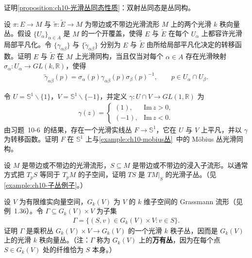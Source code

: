 \documentclass[../../main.tex]{subfiles}
\begin{document}
\begin{exercise}\label{exercise:ch10-11}
证明\cref{proposition:ch10-光滑丛同态性质}：双射丛同态是丛同构。
\end{exercise}

\begin{exercise}\label{exercise:ch10-12}
设 $\pi\colon E\to M$ 与 $\widetilde\pi\colon\widetilde E\to M$ 为带边或不带边光滑流形 $M$ 上的两个光滑 $k$ 秩向量丛。假设 $\{U_\alpha\}_{\alpha\in A}$ 是 $M$ 的一个开覆盖，使得 $E$ 与 $\widetilde E$ 在每个 $U_\alpha$ 上都容许光滑局部平凡化。令 $\{\gamma_{\alpha\beta}\}$ 与 $\{\widetilde\gamma_{\alpha\beta}\}$ 分别为 $E$ 与 $\widetilde E$ 由所给局部平凡化决定的转移函数。证明 $E$ 与 $\widetilde E$ 在 $M$ 上光滑同构，当且仅当对每个 $\alpha\in A$ 存在光滑映射 $\sigma_\alpha\colon U_\alpha\to GL(k,\mathbb{R})$，使得
\begin{align*}
\widetilde\gamma_{\alpha\beta}(p)=\sigma_\alpha(p)\gamma_{\alpha\beta}(p)\sigma_\beta(p)^{-1},\qquad p\in U_\alpha\cap U_\beta.
\end{align*}
\end{exercise}

\begin{exercise}\label{exercise:ch10-13}
令 $U=\mathbb{S}^1\smallsetminus\{1\}$，$V=\mathbb{S}^1\smallsetminus\{-1\}$，并定义 $\gamma\colon U\cap V\to GL(1,\mathbb{R})$ 为
\begin{align*}
\gamma(z)=
\begin{cases}
(1),&\mathrm{Im}\,z>0,\\
(-1),&\mathrm{Im}\,z<0.
\end{cases}
\end{align*}
由习题~10-6~的结果，存在一个光滑实线丛 $F\to\mathbb{S}^1$，它在 $U$ 与 $V$ 上平凡，并以 $\gamma$ 为转移函数。证明 $F$ 在 $\mathbb{S}^1$ 上与\cref{example:ch10-mobius丛}~中的 Möbius 丛光滑同构。
\end{exercise}

\begin{exercise}\label{exercise:ch10-14}
设 $M$ 是带边或不带边的光滑流形，$S\subseteq M$ 是带边或不带边的浸入子流形。以通常方式把 $T_pS$ 等同于 $T_pM$ 的子空间，证明 $TS$ 是 $TM|_S$ 的光滑子丛。（见\cref{example:ch10-子丛例子}。）
\end{exercise}

\begin{exercise}[万有丛]\label{exercise:ch10-15}
设 $V$ 为有限维实向量空间，$G_k(V)$ 为 $V$ 的 $k$ 维子空间的 Grassmann 流形（见例~1.36）。令 $\Gamma\subseteq G_k(V)\times V$ 为子集
\begin{align*}
\Gamma=\{(S,v)\in G_k(V)\times V:v\in S\}.
\end{align*}
证明 $\Gamma$ 是乘积丛 $G_k(V)\times V\to G_k(V)$ 的一个光滑 $k$ 秩子丛，因而是 $G_k(V)$ 上的光滑 $k$ 秩向量丛。（注：$\Gamma$ 称为 $G_k(V)$ 上的\textbf{万有丛}，因为在每个点 $S\in G_k(V)$ 处的纤维恰为 $S$ 本身。）
\end{exercise}
\end{document}
